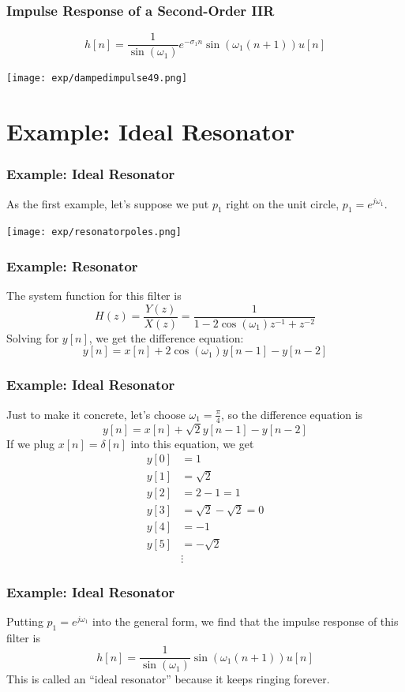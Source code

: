 \documentclass{beamer}
\begin{document}
\begin{frame}
  \frametitle{Impulse Response of a Second-Order IIR}

  \[
  h[n] = \frac{1}{\sin(\omega_1)} e^{-\sigma_1n}\sin(\omega_1(n+1)) u[n]
  \]
  \centerline{\texttt{[image: exp/dampedimpulse49.png]}}
\end{frame}


\section[Resonator]{Example: Ideal Resonator}
\setcounter{subsection}{1}

\begin{frame}
  \frametitle{Example: Ideal Resonator}

  As the first example, let's suppose we put $p_1$ right on the unit
  circle, $p_1=e^{j\omega_1}$.

  \centerline{\texttt{[image: exp/resonatorpoles.png]}}
\end{frame}

\begin{frame}
  \frametitle{Example: Resonator}

  The system function for this filter is
  \[
  H(z) = \frac{Y(z)}{X(z)} = \frac{1}{1-2\cos(\omega_1) z^{-1} + z^{-2}}
  \]
  Solving for $y[n]$, we get the difference equation:
  \[
  y[n] = x[n] + 2\cos(\omega_1) y[n-1] - y[n-2]
  \]
\end{frame}

\begin{frame}
  \frametitle{Example: Ideal Resonator}

  Just to make it concrete, let's choose $\omega_1=\frac{\pi}{4}$, so
  the difference equation is 
  \[
  y[n] = x[n] + \sqrt{2} y[n-1] - y[n-2]
  \]
  If we plug $x[n]=\delta[n]$ into this equation, we get
  \begin{align*}
    y[0] &= 1\\
    y[1] &= \sqrt{2}\\
    y[2] &= 2-1 =1\\
    y[3] &= \sqrt{2}-\sqrt{2}=0\\
    y[4] &= -1\\
    y[5] &= -\sqrt{2}\\
    &\vdots
  \end{align*}
\end{frame}

\begin{frame}
  \frametitle{Example: Ideal Resonator}

  Putting $p_1=e^{j\omega_1}$ into the general form, we find that the
  impulse response of this filter is
  \[
  h[n] = \frac{1}{\sin(\omega_1)}\sin(\omega_1 (n+1))u[n]
  \]
  This is called an ``ideal resonator'' because it keeps ringing forever.
  
\end{frame}
\end{document}
